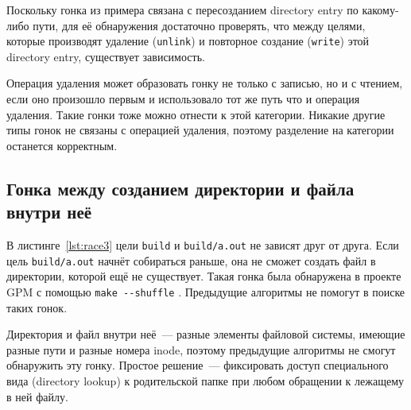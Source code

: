 Поскольку гонка из примера связана с пересозданием directory entry по какому-либо пути, для её обнаружения достаточно проверять, что между целями, которые производят удаление (\texttt{unlink}) и повторное создание (\texttt{write}) этой directory entry, существует зависимость.

Операция удаления может образовать гонку не только с записью, но и с чтением, если оно произошло первым и использовало тот же путь что и операция удаления. Такие гонки тоже можно отнести к этой категории. Никакие другие типы гонок не связаны с операцией удаления, поэтому разделение на категории останется корректным.

\subsection{Гонка между созданием директории и файла внутри неё}
\label{subsec:dir-race}



В листинге~\ref{lst:race3} цели \texttt{build} и \texttt{build/a.out} не зависят друг от друга. Если цель \texttt{build/a.out} начнёт собираться раньше, она не сможет создать файл в директории, которой ещё не существует. Такая гонка была обнаружена в проекте GPM с помощью \texttt{make -{}-shuffle} \cite{race-3-example}. Предыдущие алгоритмы не помогут в поиске таких гонок.

Директория и файл внутри неё~--- разные элементы файловой системы, имеющие разные пути и разные номера inode, поэтому предыдущие алгоритмы не смогут обнаружить эту гонку. Простое решение~--- фиксировать доступ специального вида (directory lookup) к родительской папке при любом обращении к лежащему в ней файлу.

